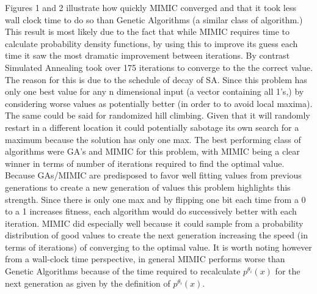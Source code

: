 \documentclass[11pt]{article}
\begin{document}
    Figures 1 and 2 illustrate how quickly MIMIC converged and that it took less wall clock time to do so than Genetic Algorithms
    (a similar class of algorithm.)
    This result is most likely due to the fact that while MIMIC requires time to calculate probability density functions,
    by using this to improve its guess each time it saw the most dramatic improvement between iterations.
    By contrast Simulated Annealing took over 175 iterations to converge to the the correct value.
    The reason for this is due to the schedule of decay of SA. Since this problem has only one best value for any n
    dimensional input (a vector containing all 1's,) by considering worse values as potentially better (in order to
    to avoid local maxima).
    The same could be said for randomized hill climbing.
    Given that it will randomly restart in a different location it could potentially sabotage its own search for a maximum
    because the solution has only one max.
    The best performing class of algorithms were GA's and MIMIC for this problem, with MIMIC being a clear winner in terms
    of number of iterations required to find the optimal value.
    Because GAs/MIMIC are predisposed to favor well fitting values from previous generations to create a new generation
    of values this problem highlights this strength.
    Since there is only one max and by flipping one bit each time from a 0 to a 1 increases fitness, each algorithm would
    do successively better with each iteration.
    MIMIC did especially well because it could sample from a probability distribution of good values to create the next generation
    increasing the speed (in terms of iterations) of converging to the optimal value.
    It is worth noting however from a wall-clock time perspective, in general MIMIC performs worse than Genetic Algorithms
    because of the time required to recalculate $p^{\theta_i} (x)$ for the next generation as given by the definition of $p^{\theta_i} (x)$.\cite{Isbell97}
\end{document}

